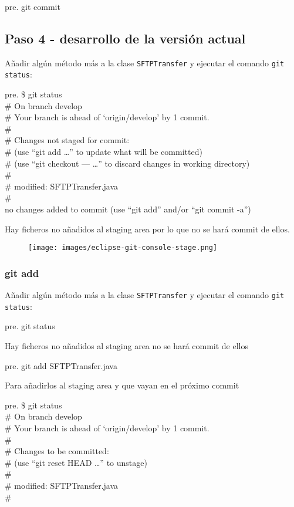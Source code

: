 pre. git commit

\subsection{Paso 4 - desarrollo de la versión actual}

Añadir algún método más a la clase \texttt{SFTPTransfer} y ejecutar el
comando \texttt{git status}:

pre. \$ git status\\\# On branch develop\\\# Your branch is ahead of
`origin/develop' by 1 commit.\\\#\\\# Changes not staged for commit:\\\#
(use ``git add \ldots{}'' to update what will be committed)\\\# (use
``git checkout --- \ldots{}'' to discard changes in working
directory)\\\#\\\# modified: SFTPTransfer.java\\\#\\no changes added to
commit (use ``git add'' and/or ``git commit -a'')

Hay ficheros no añadidos al staging area por lo que no se hará commit de
ellos.

\begin{figure}[htbp]
\centering
\texttt{[image: images/eclipse-git-console-stage.png]}
\caption{}
\end{figure}

\subsubsection{git add}

Añadir algún método más a la clase \texttt{SFTPTransfer} y ejecutar el
comando \texttt{git status}:

pre. git status

Hay ficheros no añadidos al staging area no se hará commit de ellos

pre. git add SFTPTransfer.java

Para añadirlos al staging area y que vayan en el próximo commit

pre. \$ git status\\\# On branch develop\\\# Your branch is ahead of
`origin/develop' by 1 commit.\\\#\\\# Changes to be committed:\\\# (use
``git reset HEAD \ldots{}'' to unstage)\\\#\\\# modified:
SFTPTransfer.java\\\#

